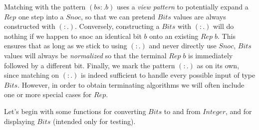 \documentclass{jfp}
\newcommand{\Conid}[1]{\mathit{#1}}
\newcommand{\Varid}[1]{\mathit{#1}}
\theoremstyle{definition}
\theoremstyle{remark}
\newcommand{\term}[1]{\emph{#1}}
\begin{document}
Matching with the pattern \ensuremath{(\Varid{bs}\mathrel{:\!.}\Varid{b})} uses a \term{view pattern}
\citep{erwig2001pattern} to potentially expand a \ensuremath{\Conid{Rep}} one step into a
\ensuremath{\Conid{Snoc}}, so that we can pretend \ensuremath{\Conid{Bits}} values are always constructed
with \ensuremath{(\mathrel{:\!.})}.  Conversely, constructing a \ensuremath{\Conid{Bits}} with \ensuremath{(\mathrel{:\!.})} will do
nothing if we happen to snoc an identical bit \ensuremath{\Varid{b}} onto an existing
\ensuremath{\Conid{Rep}\;\Varid{b}}.  This ensures that as long as we stick to using \ensuremath{(\mathrel{:\!.})} and
never directly use \ensuremath{\Conid{Snoc}}, \ensuremath{\Conid{Bits}} values will always be
\emph{normalized} so that the terminal \ensuremath{\Conid{Rep}\;\Varid{b}} is immediately followed
by a different bit.  Finally, we mark the pattern \ensuremath{(\mathrel{:\!.})} as
 on its own, since matching on \ensuremath{(\mathrel{:\!.})} is indeed
sufficient to handle every possible input of type \ensuremath{\Conid{Bits}}.  However, in
order to obtain terminating algorithms we will often include one or
more special cases for \ensuremath{\Conid{Rep}}.

Let's begin with some functions for converting \ensuremath{\Conid{Bits}} to and from
\ensuremath{\Conid{Integer}}, and for displaying \ensuremath{\Conid{Bits}} (intended only for testing).
\end{document}
